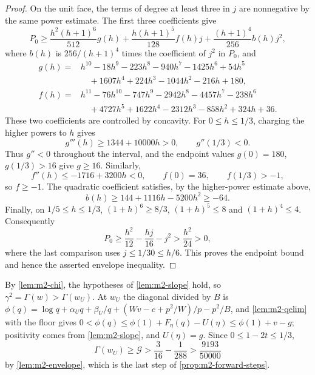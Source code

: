 \begin{proof}
On the unit face, the terms of degree at least three in $j$ are nonnegative
by the same power estimate. The first three coefficients give
\[
 P_0\ge\frac{h^2(h+1)^6}{512}g(h)
       +\frac{h(h+1)^5}{128}f(h)j
       +\frac{(h+1)^4}{256}b(h)j^2,
\]
where $b(h)$ is $256/(h+1)^4$ times the coefficient of $j^2$ in $P_0$, and
\begin{align*}
 g(h)={}&h^{10}-18h^9-223h^8-940h^7-1425h^6+54h^5\\
        &\quad+1607h^4+224h^3-1044h^2-216h+180,\\
 f(h)={}&h^{11}-76h^{10}-747h^9-2942h^8-4457h^7-238h^6\\
        &\quad+4727h^5+1622h^4-2312h^3-858h^2+324h+36.
\end{align*}
These two coefficients are controlled by concavity.
For $0\le h\le1/3$, charging the higher powers to $h$ gives
\[
 g'''(h)\ge1344+10000h>0,\qquad g''(1/3)<0.
\]
Thus $g''<0$ throughout the interval, and the endpoint values $g(0)=180$,
$g(1/3)>16$ give $g\ge16$.
Similarly,
\[
 f''(h)\le-1716+3200h<0,
 \qquad f(0)=36,\qquad f(1/3)>-1,
\]
so $f\ge-1$.
The quadratic coefficient satisfies, by the higher-power estimate above,
\[
 b(h)\ge144+1116h-5200h^2\ge-64.
\]
Finally, on $1/5\le h\le1/3$,
$(1+h)^6\ge8/3$, $(1+h)^5\le8$ and $(1+h)^4\le4$.
Consequently
\[
 P_0\ge\frac{h^2}{12}-\frac{hj}{16}-j^2>\frac{h^2}{24}>0,
\]
where the last comparison uses $j\le1/30\le h/6$.
This proves the endpoint bound and hence the asserted envelope inequality.
\end{proof}

 By \cref{lem:m2-chi}, the hypotheses of \cref{lem:m2-slope} hold, so
$\gamma^2=\Gamma(w)>\Gamma(w_U)$. At $w_U$ the diagonal divided by $B$ is
$\phi(q)=\log q+\alpha_Uq+\beta_U/q+(Wv-c+p^2/W)/p-p^2/B$, and \cref{lem:m2-qelim} with the floor
gives $0<\phi(q)\le\phi(1)+F_\eta(q)-U(\eta)\le\phi(1)+v-g$; positivity comes from
\cref{lem:m2-slope}, and $U(\eta)=g$. Since $0\le1-2t\le1/3$,
\[
 \Gamma(w_U)\ge\mathcal G>\frac3{16}-\frac1{288}>\frac{9193}{50000}
\]
by \cref{lem:m2-envelope}, which is the last step of \cref{prop:m2-forward-steps}.
